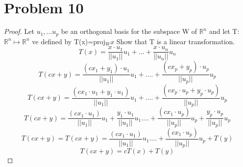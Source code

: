 \documentclass[12pt]{article}
\newcommand{\sect}[1]{\section*{#1}}
\newcommand{\R}{\mathbb{R}}
\begin{document}
\sect{Problem 10}
\begin{proof}
  Let $u_1,...u_p$ be an orthogonal basis for the subspace W of $\R^n$ and let T: $
  \R^n \mapsto \R^n$ ve defined by T(x)=proj$_Wx$ Show that T is a linear transformation.
\[
  T(x)=\frac{x\cdot u_1}{||u_1||}u_1+...+\frac{x\cdot u_n}{||u_n||}u_n
\]
\[
  T(cx+y)=\frac{(cx_1+y_1)\cdot u_1}{||u_1||}u_1+....+\frac{(cx_p+y_p)\cdot u_p}{||u_p||}u_p
\]
\[
  T(cx+y)=\frac{(cx_1\cdot u_1+y_1\cdot u_1)}{||u_1||}u_1+....+\frac{(cx_p\cdot u_p+y_p\cdot u_p)}{||u_p||}u_p
\]
\[
  T(cx+y)=\frac{(cx_1\cdot u_1)}{||u_1||}u_1+\frac{y_1\cdot u_1}{||u_1||}u_1....+\frac{(cx_1\cdot u_p)}{||u_p||}u_p+\frac{y_p\cdot u_p}{||u_p||}u_p
\]
\[
  T(cx+y)=  T(cx+y)=\frac{(cx_1\cdot u_1)}{||u_1||}u_1....+\frac{(cx_1\cdot u_p)}{||u_p||}u_p+T(y)
\]
\[
  T(cx+y)=cT(x)+T(y)
\]
\end{proof}
\end{document}

